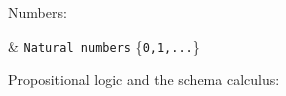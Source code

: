 \documentclass[a4paper,9pt,twoside]{article}
\begin{document}
Numbers:
\begin{symtab}
        \nat & \verb/Natural numbers/ \{\verb/0,1,.../\} \\
\end{symtab}
Propositional logic and the schema calculus:
\end{document}
